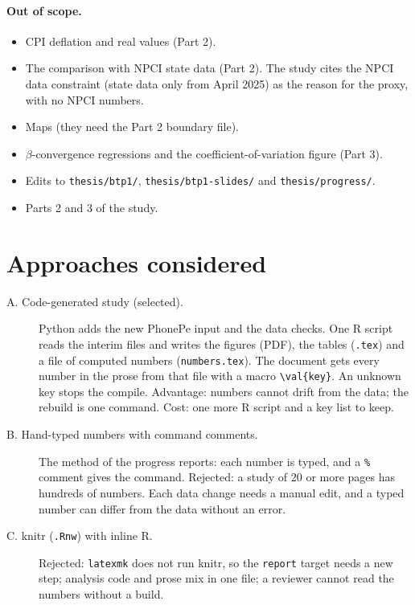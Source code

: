 \documentclass[11pt,a4paper]{article}
\newcommand{\f}[1]{\texttt{#1}}
\begin{document}
\paragraph{Out of scope.}
\begin{itemize}
  \item CPI deflation and real values (Part 2).
  \item The comparison with NPCI state data (Part 2). The study cites the NPCI data constraint (state
        data only from April 2025) as the reason for the proxy, with no NPCI numbers.
  \item Maps (they need the Part 2 boundary file).
  \item $\beta$-convergence regressions and the coefficient-of-variation figure (Part 3).
  \item Edits to \f{thesis/btp1/}, \f{thesis/btp1-slides/} and \f{thesis/progress/}.
  \item Parts 2 and 3 of the study.
\end{itemize}

\section{Approaches considered}

\begin{description}
  \item[A. Code-generated study (selected).] Python adds the new PhonePe input and the data checks.
        One R script reads the interim files and writes the figures (PDF), the tables (\f{.tex}) and a
        file of computed numbers (\f{numbers.tex}). The document gets every number in the prose from that
        file with a macro \verb|\val{key}|. An unknown key stops the compile.
        Advantage: numbers cannot drift from the data; the rebuild is one command.
        Cost: one more R script and a key list to keep.
  \item[B. Hand-typed numbers with command comments.] The method of the progress reports: each number is
        typed, and a \verb|%| comment gives the command. Rejected: a study of 20 or more pages has
        hundreds of numbers. Each data change needs a manual edit, and a typed number can differ from
        the data without an error.
  \item[C. knitr (\f{.Rnw}) with inline R.] Rejected: \f{latexmk} does not run knitr, so the
        \f{report} target needs a new step; analysis code and prose mix in one file; a reviewer cannot
        read the numbers without a build.
\end{description}
\end{document}
